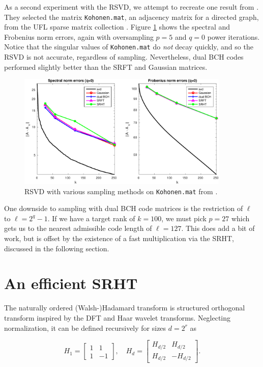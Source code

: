 \documentclass[12pt]{article}
\begin{document}
As a second experiment with the RSVD, we attempt to recreate one result from \cite{ubaru2015low}.  They selected the matrix \texttt{Kohonen.mat}, an adjacency matrix for a directed graph, from the UFL sparse matrix collection \cite{ufl_smc}.  Figure \ref{fig:rsvd_compare_kohonen} shows the spectral and Frobenius norm errors, again with oversampling $p=5$ and $q=0$ power iterations.  Notice that the singular values of \texttt{Kohonen.mat} do \emph{not} decay quickly, and so the RSVD is not accurate, regardless of sampling.  Nevertheless, dual BCH codes performed slightly better than the SRFT and Gaussian matrices.

\begin{figure}[h!]
   \centering
   \includegraphics[width=0.9\textwidth]{figures/kohonen_rsvd_compare_trim.pdf}
   \caption{RSVD with various sampling methods on \texttt{Kohonen.mat} from \cite{ufl_smc}.}
   \label{fig:rsvd_compare_kohonen}
\end{figure}

One downside to sampling with dual BCH code matrices is the restriction of $\ell$ to $\ell=2^q-1$.  If we have a target rank of $k=100$, we must pick $p=27$ which gets us to the nearest admissible code length of $\ell=127$.  This does add a bit of work, but is offset by the existence of a fast multiplication via the SRHT, discussed in the following section.


\section{An efficient SRHT}
The naturally ordered (Walsh-)Hadamard transform is structured orthogonal transform inspired by the DFT and Haar wavelet transforms.  Neglecting normalization, it can be defined recursively for sizes $d=2^r$ as

\begin{equation}
\label{eq:had_rec}
H_1 = \begin{bmatrix}1 & 1\\1 & -1\end{bmatrix}, \quad H_d = \begin{bmatrix}H_{d/2}&H_{d/2}\\H_{d/2}&-H_{d/2}\end{bmatrix}.
\end{equation}
\end{document}
